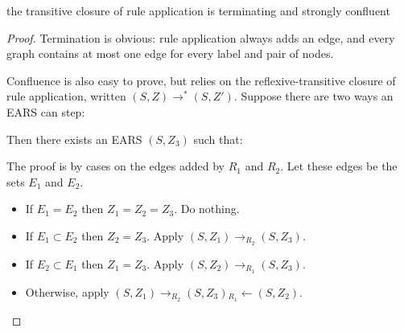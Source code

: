 \documentclass{article}
\begin{document}
\begin{theorem}
  the transitive closure of rule application is terminating and strongly confluent
\end{theorem}
\begin{proof}
Termination is obvious: rule application always adds an edge, and every graph contains at most one edge for every label and pair of nodes.

Confluence is also easy to prove, but relies on the reflexive-transitive closure of rule application, written $(S,Z) \rightarrow^* (S,Z')$.
Suppose there are two ways an EARS can step:
\begin{center}\end{center}

Then there exists an EARS $(S, Z_3)$ such that:

\begin{center}\end{center}

The proof is by cases on the edges added by $R_1$ and $R_2$.
Let these edges be the sets $E_1$ and $E_2$.
\begin{itemize}
\item If $E_1 = E_2$ then $Z_1 = Z_2 = Z_3$. Do nothing.
\item If $E_1 \subset E_2$ then $Z_2 = Z_3$. Apply $(S, Z_1) \rightarrow_{R_2} (S, Z_3)$.
\item If $E_2 \subset E_1$ then $Z_1 = Z_3$. Apply $(S, Z_2) \rightarrow_{R_1} (S, Z_3)$.
\item Otherwise, apply $(S, Z_1) \rightarrow_{R_2} (S, Z_3) {}_{R_1}\leftarrow (S, Z_2)$.
\end{itemize}
\end{proof}
\end{document}
